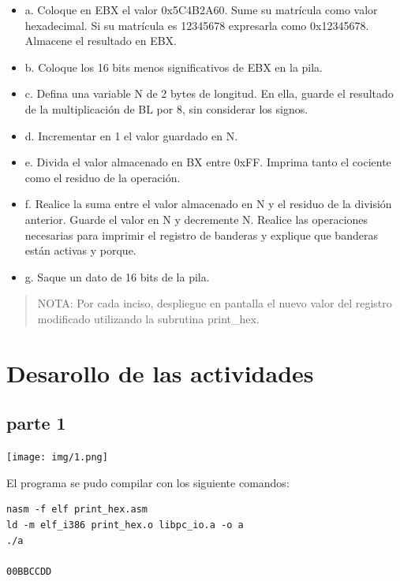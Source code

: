 \documentclass[12pt]{article}
\begin{document}
\begin{itemize}
\item a. Coloque en EBX el valor 0x5C4B2A60. Sume su matrícula como valor hexadecimal. Si su matrícula es 12345678 expresarla como 0x12345678. Almacene el resultado en EBX.

\item b. Coloque los 16 bits menos significativos de EBX en la pila.

\item c. Defina una variable N de 2 bytes de longitud. En ella, guarde el resultado de la multiplicación de BL por 8, sin considerar los signos.

\item d. Incrementar en 1 el valor guardado en N.

\item e. Divida el valor almacenado en BX entre 0xFF. Imprima tanto el cociente como el residuo de la operación.

\item f. Realice la suma entre el valor almacenado en N y el residuo de la división anterior. Guarde el valor en N y decremente N. Realice las operaciones necesarias para imprimir el registro de banderas y explique que banderas están activas y porque.

\item g. Saque un dato de 16 bits de la pila.
\end{itemize}

\begin{verse}
NOTA: Por cada inciso, despliegue en pantalla el nuevo valor del registro modificado utilizando la subrutina print\_hex.\\
\end{verse}

\pagebreak


\section*{Desarollo de las actividades}
\label{sec:orgd7a9dc9}
\subsection*{parte 1}
\label{sec:org4bc7f1f}

\begin{center}
\texttt{[image: img/1.png]}
\end{center}

El programa se pudo compilar con los siguiente comandos:
\begin{verbatim}
nasm -f elf print_hex.asm
ld -m elf_i386 print_hex.o libpc_io.a -o a
./a

00BBCCDD
\end{verbatim}
\end{document}
